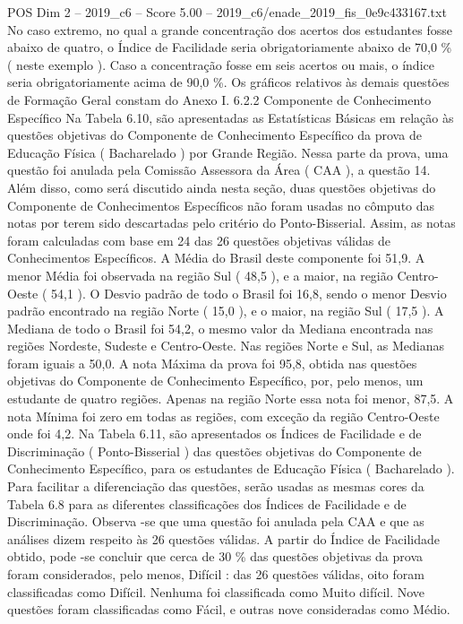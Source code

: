 \begin{textsample}{POS Dim 2 – 2019\_c6 – Score 5.00 – 2019\_c6/enade\_2019\_fis\_0e9c433167.txt}
No caso extremo, no qual a grande concentração dos acertos dos estudantes fosse abaixo de quatro, o Índice de Facilidade seria obrigatoriamente abaixo de 70,0 \% ( neste exemplo ).
Caso a concentração fosse em seis acertos ou mais, o índice seria obrigatoriamente acima de 90,0 \%.
Os gráficos relativos às demais questões de Formação Geral constam do Anexo I. 6.2.2 Componente de Conhecimento Específico Na Tabela 6.10, são apresentadas as Estatísticas Básicas em relação às questões objetivas do Componente de Conhecimento Específico da prova de Educação Física ( Bacharelado ) por Grande Região.
Nessa parte da prova, uma questão foi anulada pela Comissão Assessora da Área ( CAA ), a questão 14.
Além disso, como será discutido ainda nesta seção, duas questões objetivas do Componente de Conhecimentos Específicos não foram usadas no cômputo das notas por terem sido descartadas pelo critério do Ponto-Bisserial.
Assim, as notas foram calculadas com base em 24 das 26 questões objetivas válidas de Conhecimentos Específicos.
A Média do Brasil deste componente foi 51,9.
A menor Média foi observada na região Sul ( 48,5 ), e a maior, na região Centro-Oeste ( 54,1 ).
O Desvio padrão de todo o Brasil foi 16,8, sendo o menor Desvio padrão encontrado na região Norte ( 15,0 ), e o maior, na região Sul ( 17,5 ).
A Mediana de todo o Brasil foi 54,2, o mesmo valor da Mediana encontrada nas regiões Nordeste, Sudeste e Centro-Oeste.
Nas regiões Norte e Sul, as Medianas foram iguais a 50,0.
A nota Máxima da prova foi 95,8, obtida nas questões objetivas do Componente de Conhecimento Específico, por, pelo menos, um estudante de quatro regiões.
Apenas na região Norte essa nota foi menor, 87,5.
A nota Mínima foi zero em todas as regiões, com exceção da região Centro-Oeste onde foi 4,2.
Na Tabela 6.11, são apresentados os Índices de Facilidade e de Discriminação ( Ponto-Bisserial ) das questões objetivas do Componente de Conhecimento Específico, para os estudantes de Educação Física ( Bacharelado ).
Para facilitar a diferenciação das questões, serão usadas as mesmas cores da Tabela 6.8 para as diferentes classificações dos Índices de Facilidade e de Discriminação.
Observa -se que uma questão foi anulada pela CAA e que as análises dizem respeito às 26 questões válidas.
A partir do Índice de Facilidade obtido, pode -se concluir que cerca de 30 \% das questões objetivas da prova foram considerados, pelo menos, Difícil : das 26 questões válidas, oito foram classificadas como Difícil.
Nenhuma foi classificada como Muito difícil.
Nove questões foram classificadas como Fácil, e outras nove consideradas como Médio.

\end{textsample}
